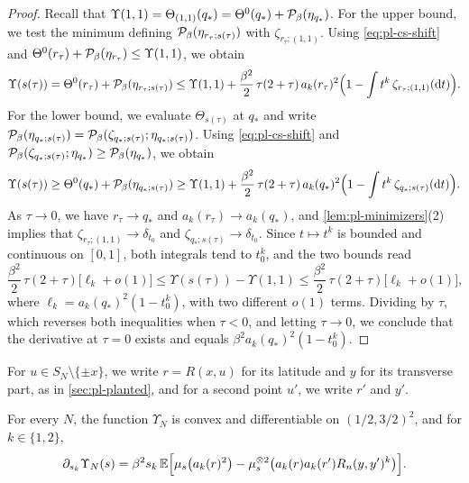 \begin{proof}
Recall that $\Upsilon(1,1)=\Theta_{(1,1)}(q_*)=\Theta^0(q_*)+\mathcal P_\beta(\eta_{q_*})$. For the upper bound, we test the minimum defining $\mathcal P_\beta(\eta_{r_\tau;s(\tau)})$ with $\zeta_{r_\tau;(1,1)}$. Using \eqref{eq:pl-cs-shift} and $\Theta^0(r_\tau)+\mathcal P_\beta(\eta_{r_\tau})\le\Upsilon(1,1)$, we obtain
\[
\Upsilon(s(\tau))=\Theta^0(r_\tau)+\mathcal P_\beta(\eta_{r_\tau;s(\tau)})
\le\Upsilon(1,1)+\frac{\beta^2}2\,\tau(2+\tau)\,a_k(r_\tau)^2\Bigl(1-\int t^k\,\zeta_{r_\tau;(1,1)}(\mathrm dt)\Bigr).
\]
For the lower bound, we evaluate $\Theta_{s(\tau)}$ at $q_*$ and write $\mathcal P_\beta(\eta_{q_*;s(\tau)})=\mathcal P_\beta(\zeta_{q_*;s(\tau)};\eta_{q_*;s(\tau)})$. Using \eqref{eq:pl-cs-shift} and $\mathcal P_\beta(\zeta_{q_*;s(\tau)};\eta_{q_*})\ge\mathcal P_\beta(\eta_{q_*})$, we obtain
\[
\Upsilon(s(\tau))\ge\Theta^0(q_*)+\mathcal P_\beta(\eta_{q_*;s(\tau)})
\ge\Upsilon(1,1)+\frac{\beta^2}2\,\tau(2+\tau)\,a_k(q_*)^2\Bigl(1-\int t^k\,\zeta_{q_*;s(\tau)}(\mathrm dt)\Bigr).
\]
As $\tau\to0$, we have $r_\tau\to q_*$ and $a_k(r_\tau)\to a_k(q_*)$, and \cref{lem:pl-minimizers}(2) implies that $\zeta_{r_\tau;(1,1)}\to\delta_{t_0}$ and $\zeta_{q_*;s(\tau)}\to\delta_{t_0}$. Since $t\mapsto t^k$ is bounded and continuous on $[0,1]$, both integrals tend to $t_0^k$, and the two bounds read
\[
\frac{\beta^2}2\,\tau(2+\tau)\bigl[\ell_k+o(1)\bigr]
\le\Upsilon(s(\tau))-\Upsilon(1,1)\le
\frac{\beta^2}2\,\tau(2+\tau)\bigl[\ell_k+o(1)\bigr],
\]
where $\ell_k=a_k(q_*)^2(1-t_0^k)$, with two different $o(1)$ terms. Dividing by $\tau$, which reverses both inequalities when $\tau<0$, and letting $\tau\to0$, we conclude that the derivative at $\tau=0$ exists and equals $\beta^2a_k(q_*)^2(1-t_0^k)$.
\end{proof}

For $u\in S_N\setminus\{\pm x\}$, we write $r=R(x,u)$ for its latitude and $y$ for its transverse part, as in \cref{sec:pl-planted}, and for a second point $u'$, we write $r'$ and $y'$.

\begin{lemma}\label{lem:pl-ibp}
For every $N$, the function $\Upsilon_N$ is convex and differentiable on $(1/2,3/2)^2$, and for $k\in\{1,2\}$,
\begin{equation}\label{eq:pl-ibp}
\partial_{s_k}\Upsilon_N(s)=\beta^2s_k\,\mathbb E\Bigl[\mu_s\bigl(a_k(r)^2\bigr)-\mu_s^{\otimes2}\bigl(a_k(r)a_k(r')R_n(y,y')^k\bigr)\Bigr].
\end{equation}
\end{lemma}

